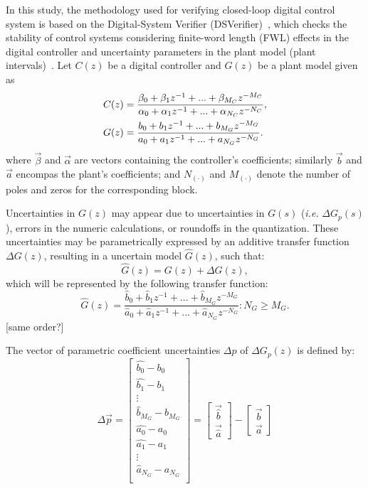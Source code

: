 \documentclass{sig-alternate-05-2015}
\newcommand{\red}[1]{{\color{red}#1}}
\begin{document}
In this study, the methodology used for verifying closed-loop digital
control system is based on the Digital-System Verifier
(DSVerifier)~\cite{IsmailBCFF15}, which checks the stability of control
systems considering finite-word length (FWL) effects in the digital
controller and uncertainty parameters in the plant model (plant
intervals)~\cite{Bessa16}.  Let $C(z)$ be a digital controller and $G(z)$ be
a plant model given as
%
\begin{align}
\small
\label{controller_plant_tf}
C(z)&=\frac{\beta_{0}+\beta_{1}z^{-1}+...+\beta_{M_C}z^{-M_C}}{\alpha_{0}+\alpha_{1}z^{-1}+...+\alpha_{N_C}z^{-N_C}}, \\
G(z)&=\frac{b_{0}+b_{1}z^{-1}+...+b_{M_G}z^{-M_G}}{a_{0}+a_{1}z^{-1}+...+a_{N_G}z^{-N_G}}.
\end{align}
%
\noindent where $\vec{\beta}$ and $\vec{\alpha}$ are vectors containing the controller's coefficients;  
similarly $\vec{b}$ and $\vec{a}$ encompas the plant's coefficients;  
and $N_{(\cdot)}$ and $M_{(\cdot)}$ denote the number of poles and zeros for the corresponding block.



Uncertainties in $G(z)$ may appear due to uncertainties in $G(s)$ (\emph{i.e.} $\Delta{G}_p(s)$), errors in the numeric calculations, or roundoffs in the quantization.
These uncertainties may be parametrically expressed by an additive transfer function $\Delta G(z)$, resulting in a uncertain model $\hat{G}(z)$, such that:
\begin{equation}
\hat{G}(z)=G(z)+\Delta G(z),
\end{equation}
which will be represented by the following transfer function:
\begin{equation}
\hat{G}(z)=\frac{\hat{b}_{0}+\hat{b}_{1}z^{-1}+...+\hat{b}_{M_G}z^{-M_G}}{\hat{a}_{0}+\hat{a}_{1}z^{-1}+...+\hat{a}_{N_G}z^{-N_G}} : N_G \geq M_G .
\end{equation}
\red{[same order?]} 

The vector of parametric coefficient uncertainties $\Delta{p}$ of $\Delta{G}_p(z)$ is defined by:
\begin{equation}
\Delta{\vec{p}}=\begin{bmatrix}
\hat{b_{0}} - b_{0}\\
\hat{b_{1}} - b_{1}\\
\vdots \\
\hat{b}_{M_G} - b_{M_{G}}\\
\hat{a_{0}} - a_{0}\\
\hat{a_{1}} - a_{1}\\
\vdots\\
\hat{a}_{N_G} - a_{N_{G}}\\
\end{bmatrix}=\begin{bmatrix}
\vec{\hat{b}}\\
\vec{\hat{a}}
\end{bmatrix}-\begin{bmatrix}
\vec{b}\\
\vec{a}
\end{bmatrix}
\end{equation}
\end{document}
